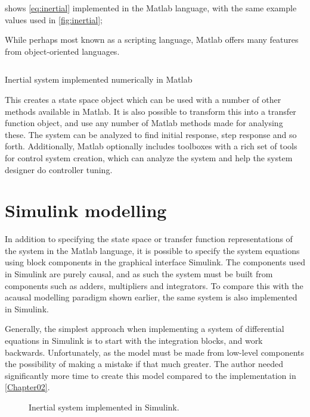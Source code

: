 \documentclass[\rootfolder/main.tex]{subfiles}
\begin{document}
 shows \cref{eq:inertial} implemented in the Matlab language, with the same example values used in \cref{fig:inertial};

While perhaps most known as a scripting language, Matlab offers many features from object-oriented languages.

\begin{listing}[ht]
    \inputminted[fontsize=\footnotesize, firstline=1, lastline=9]{matlab}{\rootfolder/Models/Matlab/InertialMatlab.m}
    \caption{Inertial system implemented numerically in Matlab\label{lst:inertialmatlab}}
\end{listing}

This creates a state space object which can be used with a number of other methods available in Matlab.
It is also possible to transform this into a transfer function object, and use any number of Matlab methods made for analysing these.
The system can be analyzed to find initial response, step response and so forth.
Additionally, Matlab optionally includes toolboxes with a rich set of tools for control system creation, which can analyze the system and help the system designer do controller tuning.

\section{Simulink modelling}

In addition to specifying the state space or transfer function representations of the system in the Matlab language, it is possible to specify
the system equations using block components in the graphical interface Simulink.
The components used in Simulink are purely causal, and as such the system must be built from components such as adders, multipliers and integrators.
To compare this with the acausal modelling paradigm shown earlier, the same system is also implemented in Simulink.

Generally, the simplest approach when implementing a system of differential equations in Simulink is to start with the integration blocks, and work backwards.
Unfortunately, as the model must be made from low-level components the possibility of making a mistake if that much greater.
The author needed significantly more time to create this model compared to the implementation in \cref{Chapter02}.

\begin{figure}[ht]
    \caption{Inertial system implemented in Simulink.\label{fig:inertial-simulink}}
\end{figure}
\end{document}
